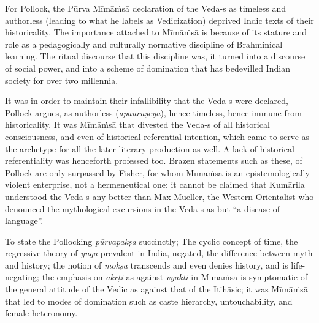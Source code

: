 For Pollock, the Pūrva Mīmāṁsā declaration of the Veda-s as timeless and authorless (leading to what he labels as Vedicization) deprived Indic texts of their historicality. The importance attached to Mīmāṁsā is because of its stature and role as a pedagogically and culturally normative discipline of Brahminical learning. The ritual discourse that this discipline was, it turned into a discourse of social power, and into a scheme of domination that has bedevilled Indian society for over two millennia.

It was in order to maintain their infallibility that the Veda-s were declared, Pollock argues, as authorless (\textit{apauruṣeya}), hence timeless, hence immune from historicality. It was Mīmāṁsā that divested the Veda-s of all historical consciousness, and even of historical referential intention, which came to serve as the archetype for all the later literary production as well. A lack of historical referentiality was henceforth professed too. Brazen statements such as these, of Pollock are only surpassed by Fisher, for whom Mīmāṁsā is an epistemologically violent enterprise, not a hermeneutical one: it cannot be claimed that Kumārila understood the Veda-s any better than Max Mueller, the Western Orientalist who denounced the mythological excursions in the Veda-s as but “a disease of language”. 

To state the Pollocking \textit{pūrvapakṣa} succinctly; The cyclic concept of time, the regressive theory of \textit{yuga} prevalent in India, negated,  the difference between myth and history; the notion of \textit{mokṣa} transcends and even denies history, and is life-negating; the emphasis on \textit{ākrṭi} as against \textit{vyakti} in Mīmāṁsā is symptomatic of the general attitude of the Vedic as against that of the Itihāsic; it was Mīmāṁsā that led to modes of domination such as caste hierarchy, untouchability, and female heteronomy.

